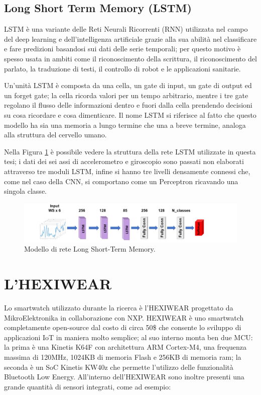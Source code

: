 \subsection{Long Short Term Memory (LSTM)}
\label{ssec:lstm}

LSTM è una variante delle Reti Neurali Ricorrenti (RNN) utilizzata nel campo del deep learning e dell'intelligenza artificiale grazie alla sua abilità nel classificare e fare predizioni basandosi sui dati delle serie temporali; per questo motivo è spesso usata in ambiti come il riconoscimento della scrittura, il riconoscimento del parlato, la traduzione di testi, il controllo di robot e le applicazioni sanitarie.

Un'unità LSTM è composta da una cella, un gate di input, un gate di output ed un forget gate; la cella ricorda valori per un tempo arbitrario, mentre i tre gate regolano il flusso delle informazioni dentro e fuori dalla cella prendendo decisioni su cosa ricordare e cosa dimenticare. Il nome LSTM si riferisce al fatto che questo modello ha sia una memoria a lungo termine che una a breve termine, analoga alla struttura del cervello umano.

Nella Figura \ref{fig:lstm-model} è possibile vedere la struttura della rete LSTM utilizzate in questa tesi; i dati dei sei assi di accelerometro e giroscopio sono passati non elaborati attraverso tre moduli LSTM, infine si hanno tre livelli densamente connessi che, come nel caso della CNN, si comportano come un Perceptron ricavando una singola classe.

\begin{figure}[!htb]
    \centering
    \includegraphics[width=\textwidth]{figure/lstm_model.png}
    \caption{Modello di rete Long Short-Term Memory.}
    \label{fig:lstm-model}
\end{figure}

\section{L'HEXIWEAR}
\label{sec:hexiwear}

Lo smartwatch utilizzato durante la ricerca è l’HEXIWEAR progettato da MikroElektronika in collaborazione con NXP. HEXIWEAR è uno smartwatch completamente open-source dal costo di circa 50\$ che consente lo sviluppo di applicazioni IoT in maniera molto semplice; al suo interno monta ben due MCU: la prima è una Kinetis K64F con architettura ARM Cortex-M4, una frequenza massima di 120MHz, 1024KB di memoria Flash e 256KB di memoria ram; la seconda è un SoC Kinetis KW40z che permette l’utilizzo delle funzionalità Bluetooth Low Energy. 
All'interno dell'HEXIWEAR sono inoltre presenti una grande quantità di sensori integrati, come ad esempio: 

